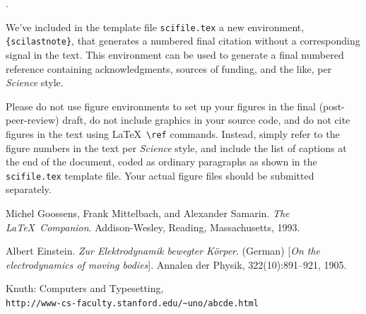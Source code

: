 \documentclass[12pt]{article}
\newcounter{lastnote}
\newenvironment{scilastnote}{%
\setcounter{lastnote}{\value{enumiv}}%
\addtocounter{lastnote}{+1}%
\begin{list}%
{\arabic{lastnote}.}
{\setlength{\leftmargin}{.22in}}
{\setlength{\labelsep}{.5em}}}
{\end{list}}
\begin{document}





\begin{scilastnote}
\item We've included in the template file \texttt{scifile.tex} a new
environment, \texttt{\{scilastnote\}}, that generates a numbered final
citation without a corresponding signal in the text.  This environment
can be used to generate a final numbered reference containing
acknowledgments, sources of funding, and the like, per {\it Science\/}
style.
\end{scilastnote}






\clearpage

 Please do not use figure environments to set
up your figures in the final (post-peer-review) draft, do not include graphics in your
source code, and do not cite figures in the text using \LaTeX\
\verb+\ref+ commands.  Instead, simply refer to the figure numbers in
the text per {\it Science\/} style, and include the list of captions at
the end of the document, coded as ordinary paragraphs as shown in the
\texttt{scifile.tex} template file.  Your actual figure files should
be submitted separately.




\begin{thebibliography}{9}

Michel Goossens, Frank Mittelbach, and Alexander Samarin. 
\textit{The \LaTeX\ Companion}. 
Addison-Wesley, Reading, Massachusetts, 1993.
 
Albert Einstein. 
\textit{Zur Elektrodynamik bewegter K{\"o}rper}. (German) 
[\textit{On the electrodynamics of moving bodies}]. 
Annalen der Physik, 322(10):891–921, 1905.
 
Knuth: Computers and Typesetting,
\\\texttt{http://www-cs-faculty.stanford.edu/\~{}uno/abcde.html}
\end{thebibliography}
\end{document}
